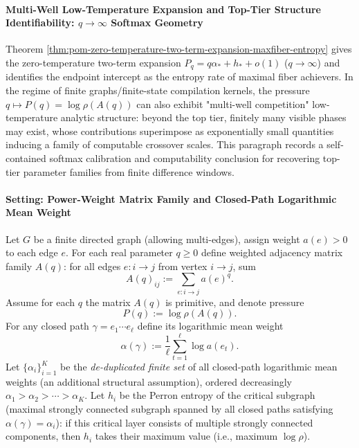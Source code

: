 
\paragraph{Multi-Well Low-Temperature Expansion and Top-Tier Structure Identifiability: \texorpdfstring{$q\to\infty$}{q->∞} Softmax Geometry}
Theorem \ref{thm:pom-zero-temperature-two-term-expansion-maxfiber-entropy} gives the zero-temperature two-term expansion
\(
P_q=q\alpha_\ast+h_\ast+o(1)
\) (\(q\to\infty\)) and identifies the endpoint intercept as the entropy rate of maximal fiber achievers.
In the regime of finite graphs/finite-state compilation kernels, the pressure \(q\mapsto P(q)=\log\rho(A(q))\) can also exhibit "multi-well competition" low-temperature analytic structure:
beyond the top tier, finitely many visible phases may exist, whose contributions superimpose as exponentially small quantities inducing a family of computable crossover scales.
This paragraph records a self-contained softmax calibration and computability conclusion for recovering top-tier parameter families from finite difference windows.

\paragraph{Setting: Power-Weight Matrix Family and Closed-Path Logarithmic Mean Weight}
Let \(G\) be a finite directed graph (allowing multi-edges), assign weight \(a(e)>0\) to each edge \(e\).
For each real parameter \(q\ge0\) define weighted adjacency matrix family \(A(q)\):
for all edges \(e:i\to j\) from vertex \(i\to j\), sum
\[
A(q)_{ij}:=\sum_{e:i\to j} a(e)^q.
\]
Assume for each \(q\) the matrix \(A(q)\) is primitive, and denote pressure
\[
P(q):=\log\rho(A(q)).
\]
For any closed path \(\gamma=e_1\cdots e_\ell\) define its logarithmic mean weight
\[
\alpha(\gamma):=\frac{1}{\ell}\sum_{t=1}^{\ell}\log a(e_t).
\]
Let \(\{\alpha_i\}_{i=1}^K\) be the \emph{de-duplicated finite set} of all closed-path logarithmic mean weights (an additional structural assumption), ordered decreasingly
\(
\alpha_1>\alpha_2>\cdots>\alpha_K
\).
Let \(h_i\) be the Perron entropy of the critical subgraph (maximal strongly connected subgraph spanned by all closed paths satisfying \(\alpha(\gamma)=\alpha_i\)):
if this critical layer consists of multiple strongly connected components, then \(h_i\) takes their maximum value (i.e., maximum \(\log\rho\)).

